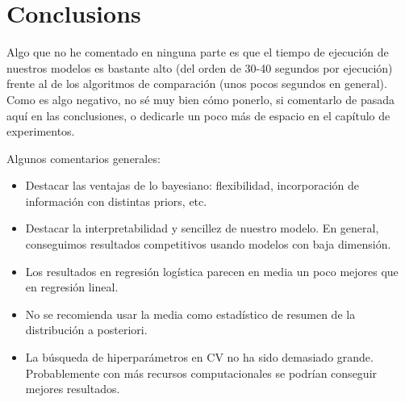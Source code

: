 %
%

\chapter{Conclusions}\label{ch:conclusions}

\begin{outcomment}
  Algo que no he comentado en ninguna parte es que el tiempo de ejecución de nuestros modelos es bastante alto (del orden de 30-40 segundos por ejecución) frente al de los algoritmos de comparación (unos pocos segundos en general). Como es algo negativo, no sé muy bien cómo ponerlo, si comentarlo de pasada aquí en las conclusiones, o dedicarle un poco más de espacio en el capítulo de experimentos.\\
\end{outcomment}

\begin{outcomment}
  Algunos comentarios generales:
  \begin{itemize}
    \item Destacar las ventajas de lo bayesiano: flexibilidad, incorporación de información con distintas priors, etc.
    \item Destacar la interpretabilidad y sencillez de nuestro modelo. En general, conseguimos resultados competitivos usando modelos con baja dimensión.
    \item Los resultados en regresión logística parecen en media un poco mejores que en regresión lineal.
    \item No se recomienda usar la media como estadístico de resumen de la distribución a posteriori.
    \item La búsqueda de hiperparámetros en CV no ha sido demasiado grande. Probablemente con más recursos computacionales se podrían conseguir mejores resultados.
  \end{itemize}
\end{outcomment}

